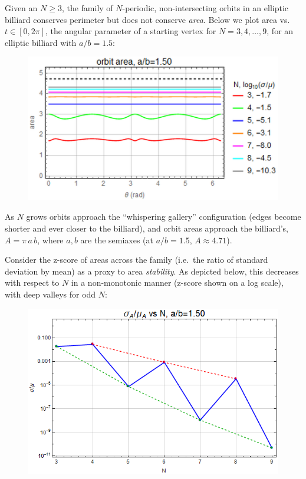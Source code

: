 \documentclass[]{article}
\begin{document}
Given an \(N\geq3\), the family of \(N\)-periodic, non-intersecting orbits in an elliptic billiard conserves perimeter but does not conserve \emph{area}. Below we plot area vs. \(t\in[0,2\pi]\), the angular parameter of a starting vertex for \(N=3,4,\ldots,9\), for an elliptic billiard with \(a/b=1.5\):

\begin{figure}[H]

{\centering \includegraphics[width=0.66\linewidth]{pics/area_vs_t} 

}

\end{figure}

As \(N\) grows orbits approach the ``whispering gallery'' configuration (edges become shorter and ever closer to the billiard), and orbit areas approach the billiard's, \(A=\pi\,a\,b\), where \(a,b\) are the semiaxes (at \(a/b=1.5\), \(A\approx 4.71\)).

Consider the z-score of areas across the family (i.e.~the ratio of standard deviation by mean) as a proxy to area \emph{stability}. As depicted below, this decreases with respect to \(N\) in a non-monotonic manner (z-score shown on a log scale), with deep valleys for odd \(N\):

\begin{figure}[H]

{\centering \includegraphics[width=0.66\linewidth]{pics/area_vs_n} 

}

\end{figure}
\end{document}
